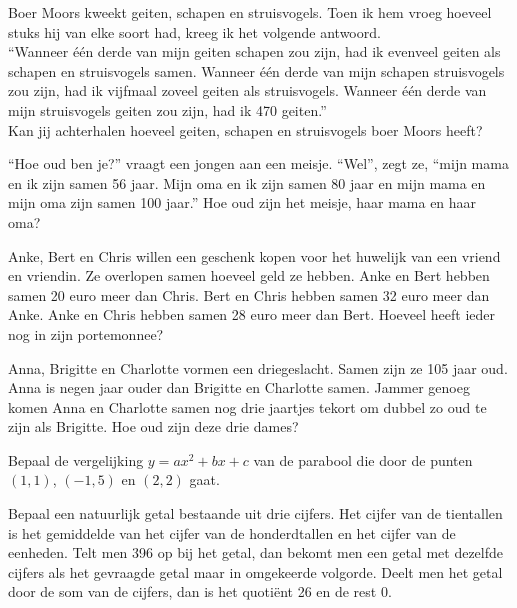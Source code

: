 \documentclass[12pt,twoside]{article}
\begin{document}
\begin{oefening}
Boer Moors kweekt geiten, schapen en struisvogels.  Toen ik hem vroeg hoeveel stuks hij van elke soort had, kreeg ik het volgende antwoord.\\
“Wanneer één derde van mijn geiten schapen zou zijn, had ik evenveel geiten als schapen en struisvogels samen.  
Wanneer één derde van mijn schapen struisvogels zou zijn, had ik vijfmaal zoveel geiten als struisvogels.
Wanneer één derde van mijn struisvogels geiten zou zijn, had ik 470 geiten.”\\
Kan jij achterhalen hoeveel geiten, schapen en struisvogels boer Moors heeft?
\end{oefening}

\begin{oefening}
“Hoe oud ben je?” vraagt een jongen aan een meisje.
“Wel”, zegt ze, “mijn mama en ik zijn samen 56 jaar.  Mijn oma en ik zijn samen 80 jaar en mijn mama en mijn oma zijn samen 100 jaar.”
Hoe oud zijn het meisje, haar mama en haar oma?
\end{oefening}

\begin{oefening}
Anke, Bert en Chris willen een geschenk kopen voor het huwelijk van een vriend en vriendin.
Ze overlopen samen hoeveel geld ze hebben.
Anke en Bert hebben samen 20 euro meer dan Chris.
Bert en Chris hebben samen 32 euro meer dan Anke.
Anke en Chris hebben samen 28 euro meer dan Bert.
Hoeveel heeft ieder nog in zijn portemonnee?
\end{oefening}

\begin{oefening}
Anna, Brigitte en Charlotte vormen een driegeslacht.  Samen zijn ze 105 jaar oud.  Anna is negen jaar ouder dan Brigitte en Charlotte samen.  Jammer genoeg komen Anna en Charlotte samen nog drie jaartjes tekort om dubbel zo oud te zijn als Brigitte.
Hoe oud zijn deze drie dames?
\end{oefening}

\begin{oefening}
Bepaal de vergelijking $y=ax^2+bx+c$ van de parabool die door de punten $(1,1)$, $(-1, 5)$ en $(2,2)$ gaat.
\end{oefening}

\begin{oefening}
Bepaal een natuurlijk getal bestaande uit drie cijfers. Het cijfer van de tientallen is het gemiddelde van het cijfer van de honderdtallen en het cijfer van de eenheden. Telt men 396 op bij het getal, dan bekomt men een getal met dezelfde cijfers als het gevraagde getal maar in omgekeerde volgorde. Deelt men het getal door de som van de cijfers, dan is het quotiënt 26 en de rest 0.
\end{oefening}
\end{document}
